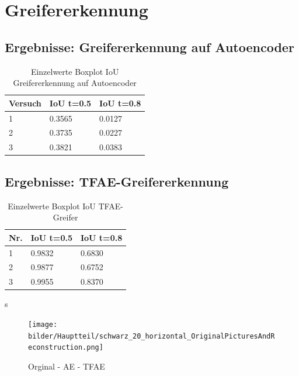\chapter{Greifererkennung}
\label{appendix:Greifererkennung}

\section{Ergebnisse: Greifererkennung auf Autoencoder}
\label{appendix:GreifererkennungAufAutoencoder}

\begin{table}[ht]
	\centering
	\begin{tabularx}{\textwidth}{lll}
		\textbf{Versuch}  & \textbf{IoU t=0.5} & \textbf{IoU t=0.8}  	 \\ \hline 
		1 & 0.3565 & 0.0127 \\
		2 & 0.3735 & 0.0227 \\
		3 & 0.3821 & 0.0383 \\ 
	\end{tabularx}
	\caption{Einzelwerte Boxplot IoU Greifererkennung auf Autoencoder}
	\label{table:EinzelwerteBoxplotIoUGreifererkennungaufAutoencoder}
\end{table}

\section{Ergebnisse: TFAE-Greifererkennung}
\label{appendix:MutliTaskGreifererkennung}

\begin{table}[ht]
	\centering
	\begin{tabularx}{\textwidth}{lll}
		\textbf{Nr.}  & \textbf{IoU t=0.5} & \textbf{IoU t=0.8}  	 \\ \hline 
		1 & 0.9832 & 0.6830 \\
		2 & 0.9877 & 0.6752 \\
		3 & 0.9955 & 0.8370 \\
	\end{tabularx}
	\caption{Einzelwerte Boxplot IoU TFAE-Greifer}
	\label{table:EinzelwerteBoxplotIoUMTGreifer}
\end{table}s

\begin{figure}[h]
	\centering
	\texttt{[image: bilder/Hauptteil/schwarz\_20\_horizontal\_OriginalPicturesAndReconstruction.png]}
	\caption{Orginal -  AE - TFAE}
	\label{img:AppendixReconstruction}	
\end{figure}

